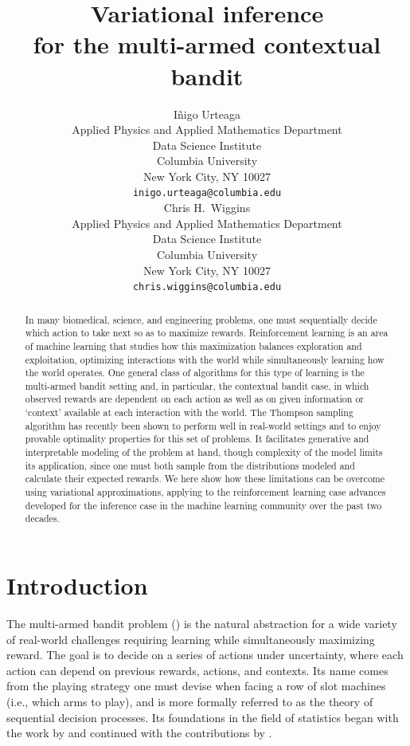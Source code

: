 \documentclass{article}
\title{Variational inference \\ for the multi-armed contextual bandit}
\author{
	I\~{n}igo Urteaga\\
	Applied Physics and Applied Mathematics Department\\
	Data Science Institute\\
	Columbia University\\
	New York City, NY 10027\\
	\texttt{inigo.urteaga@columbia.edu} \\
	\And
	Chris H.~Wiggins\\
	Applied Physics and Applied Mathematics Department\\
	Data Science Institute\\
	Columbia University\\
	New York City, NY 10027\\
	\texttt{chris.wiggins@columbia.edu}
}
\newcommand{\ie}{i.e., }
\begin{document}
\maketitle

\begin{abstract}
In many biomedical, science, and engineering problems, one must sequentially decide which action to take next so as to maximize rewards. Reinforcement learning is an area of machine learning that studies how this maximization balances exploration and exploitation, optimizing interactions with the world while simultaneously learning how the world operates. One general class of algorithms for this type of learning is the multi-armed bandit setting and, in particular, the contextual bandit case, in which observed rewards are dependent on each action as well as on given information or `context' available at each interaction with the world. The Thompson sampling algorithm has recently been shown to perform well in real-world settings and to enjoy provable optimality properties for this set of problems. It facilitates  generative and interpretable modeling of the problem at hand, though complexity of the model limits its application, since one must both sample from the distributions modeled and calculate their expected rewards. We here show how these limitations can be overcome using variational approximations, applying to the reinforcement learning case advances developed for the inference case in the machine learning community over the past two decades.
\end{abstract}

\section{Introduction}
\label{sec:introduction}

The multi-armed bandit problem (\cite{b-Sutton1998,j-Ghavamzadeh2015}) is the natural abstraction for a wide variety of real-world challenges requiring learning while simultaneously maximizing reward. The goal is to decide on a series of actions under uncertainty, where each action can depend on previous rewards, actions, and contexts. Its name comes from the playing strategy one must devise when facing a row of slot machines (\ie which arms to play), and is more formally referred to as the theory of sequential decision processes. Its foundations in the field of statistics began with the work by \cite{j-Thompson1935,j-Thompson1933} and continued with the contributions by \cite{j-Robbins1952}.
\end{document}
